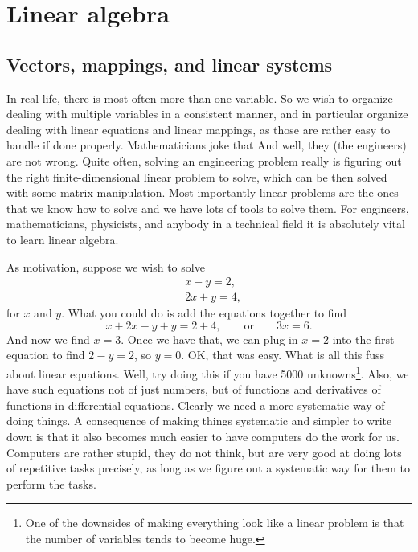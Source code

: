 \chapter{Linear algebra} \label{linalg:appendix}


\section{Vectors, mappings, and linear systems}
\label{vecsandmaps:section}


In real life, there is most often more than one variable.
So we wish to organize dealing with multiple variables in a consistent
manner, and in particular organize dealing with linear equations and linear
mappings, as those are rather easy to handle if done properly.
Mathematicians joke that
And well, they (the engineers) are not wrong. 
Quite often, solving an engineering problem really is figuring out the
right finite-dimensional linear problem to solve, which can be then
solved with some matrix manipulation.
Most importantly linear problems are the ones that we know how to solve
and we have lots of tools to solve them.
For engineers, mathematicians, physicists, and anybody in a technical
field it is absolutely vital to learn linear algebra.

As motivation, suppose we wish to solve
\begin{equation*}
\begin{aligned}
& x-y = 2 , \\
& 2x+y = 4 ,
\end{aligned}
\end{equation*}
for $x$ and $y$.
What you could do is add the equations together to find
\begin{equation*}
x+2x-y+y = 2+4, \qquad \text{or} \qquad 3x = 6 .
\end{equation*}
And now we find $x=3$.  Once we have that, we can plug in $x=2$ into the
first equation to find $2-y=2$, so $y=0$.  OK\@, that was easy.  What is all
this fuss about linear equations.  Well, try doing this if you have
5000 unknowns\footnote{One of the downsides of making everything look like a
linear problem is that the number of variables tends to become huge.}.
Also, we have such equations not of just numbers,
but of functions and derivatives of functions in differential equations.
Clearly we need a more systematic way of doing things.
A consequence of making things systematic and simpler to write down
is that it also becomes much easier to have computers do the work for us.
Computers are rather stupid, they do not think,
but are very good at doing lots of repetitive
tasks precisely, as long as we figure out a systematic way for them to
perform the tasks.

